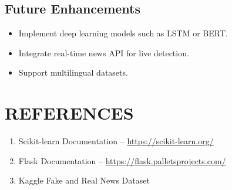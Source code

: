 \documentclass[12pt,a4paper]{report}
\begin{document}
\section{Future Enhancements}
\begin{itemize}
\item Implement deep learning models such as LSTM or BERT.
\item Integrate real-time news API for live detection.
\item Support multilingual datasets.
\end{itemize}

\chapter*{REFERENCES}
\begin{enumerate}
\item Scikit-learn Documentation – \url{https://scikit-learn.org/}
\item Flask Documentation – \url{https://flask.palletsprojects.com/}
\item Kaggle Fake and Real News Dataset
\end{enumerate}
\end{document}
